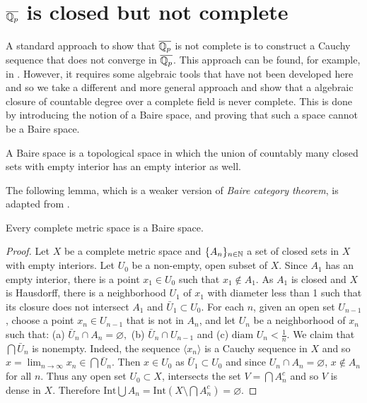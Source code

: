 \section{$\overline{\mathbb{Q}_p}$ is closed but not complete}
A standard approach to show that $\overline{\mathbb{Q}_p}$ is not complete is to construct a Cauchy sequence that does not converge in $\overline{\mathbb{Q}_p}$. 
This approach can be found, for example, in \cite[p. 219]{Gouvea_2013}. 
However, it requires some algebraic tools that have not been developed here and so we take a different and more general approach and show that a algebraic closure of countable degree over a complete field is never complete. 
This is done by introducing the notion of a Baire space, and proving that such a space cannot be a Baire space.
\begin{definition}
    A Baire space is a topological space in which the union of countably many closed sets with empty interior has an empty interior as well.
\end{definition}
The following lemma, which is a weaker version of \textit{Baire category theorem}, is adapted from \cite[p. 296]{munkres_2014}.
\begin{lemma}\label{lemma:btc}
    Every complete metric space is a Baire space.
\end{lemma}
\begin{proof}
    Let $X$ be a complete metric space and $\{A_n\}_{n\in\mathbb{N}}$ a set of closed sets in $X$ with empty interiors. Let $U_0$ be  a non-empty, open subset of $X$. Since $A_1$ has an empty interior, there is a point $x_1\in U_0$ such that $x_1\not\in A_1$. As $A_1$ is closed and $X$ is Hausdorff, there is a neighborhood $U_1$ of $x_1$ with diameter less than 1 such that its closure does not intersect $A_1$ and $\bar{U}_1\subset U_0$. For each $n$, given an open set $U_{n-1}$, choose a point $x_{n}\in U_{n-1}$ that is not in $A_n$, and let $U_n$ be a neighborhood of $x_n$ such that: (a) $\bar{U}_n\cap A_n=\varnothing,$ (b) $\bar{U}_n\cap U_{n-1}$ and (c) $\text{diam } U_n<\frac{1}{n}$. We claim that $\bigcap\bar{U}_n$ is nonempty. Indeed, the sequence $\langle x_n\rangle$ is a Cauchy sequence in $X$ and so $x=\lim_{n\to\infty} x_n\in\bigcap\bar{U}_n$. Then $x\in U_0$ as $\bar{U}_1\subset U_0$ and since $U_n\cap A_n=\varnothing$, $x\not\in A_n$ for all $n$. Thus any open set $U_0\subset X$, intersects the set $V=\bigcap A_n^c$ and so $V$ is dense in $X$. Therefore $\text{Int}\bigcup A_n = \text{Int} \left(X\setminus\bigcap A_n^c\right)=\varnothing$.
\end{proof}



